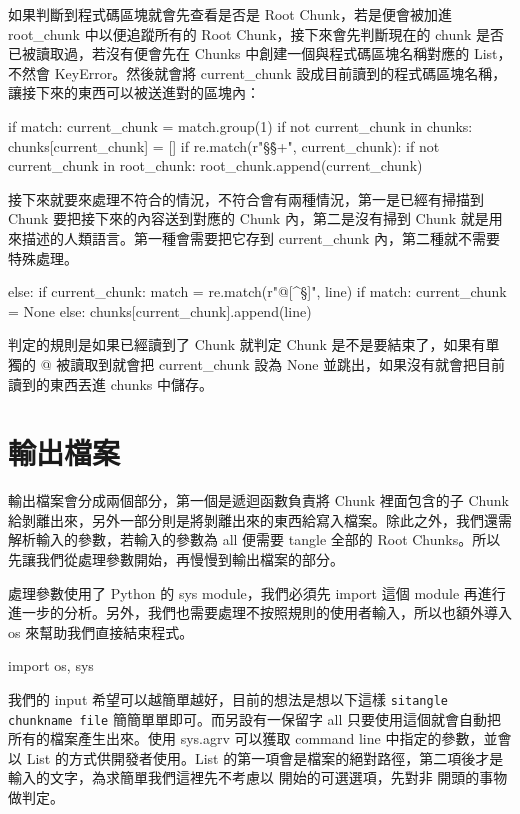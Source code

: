 \documentclass[12pt, a4paper]{NGPLB}
\begin{document}
如果判斷到程式碼區塊就會先查看是否是 Root Chunk，若是便會被加進 root\_chunk 中以便追蹤所有的 Root Chunk，接下來會先判斷現在的 chunk 是否已被讀取過，若沒有便會先在 Chunks 中創建一個與程式碼區塊名稱對應的 List，不然會 KeyError。然後就會將 current\_chunk 設成目前讀到的程式碼區塊名稱，讓接下來的東西可以被送進對的區塊內：


\begin{mylisting}
if match:
	current_chunk = match.group(1)
	if not current_chunk in chunks:
		chunks[current_chunk] = []
	if re.match(r"\S*\.\S+", current_chunk):
		if not current_chunk in root_chunk:
			root_chunk.append(current_chunk)
\end{mylisting}


接下來就要來處理不符合的情況，不符合會有兩種情況，第一是已經有掃描到 Chunk 要把接下來的內容送到對應的 Chunk 內，第二是沒有掃到 Chunk 就是用來描述的人類語言。第一種會需要把它存到 current\_chunk 內，第二種就不需要特殊處理。


\begin{mylisting}
else:
	if current_chunk:
		match = re.match(r"@[^\S]", line)
		if match:
			current_chunk = None
		else:
			chunks[current_chunk].append(line)
\end{mylisting}


判定的規則是如果已經讀到了 Chunk 就判定 Chunk 是不是要結束了，如果有單獨的 @ 被讀取到就會把 current\_chunk 設為 None 並跳出，如果沒有就會把目前讀到的東西丟進 chunks 中儲存。

\section{輸出檔案}

輸出檔案會分成兩個部分，第一個是遞迴函數負責將 Chunk 裡面包含的子 Chunk 給剝離出來，另外一部分則是將剝離出來的東西給寫入檔案。除此之外，我們還需解析輸入的參數，若輸入的參數為 all 便需要 tangle 全部的 Root Chunks。所以先讓我們從處理參數開始，再慢慢到輸出檔案的部分。

處理參數使用了 Python 的 sys module，我們必須先 import 這個 module 再進行進一步的分析。另外，我們也需要處理不按照規則的使用者輸入，所以也額外導入 os 來幫助我們直接結束程式。


\begin{mylisting}
import os, sys
\end{mylisting}


我們的 input 希望可以越簡單越好，目前的想法是想以下這樣 \verb|sitangle chunkname file| 簡簡單單即可。而另設有一保留字 all 只要使用這個就會自動把所有的檔案產生出來。使用 sys.agrv 可以獲取 command line 中指定的參數，並會以 List 的方式供開發者使用。List 的第一項會是檔案的絕對路徑，第二項後才是輸入的文字，為求簡單我們這裡先不考慮以 \-\- 開始的可選選項，先對非 \-\- 開頭的事物做判定。
\end{document}
